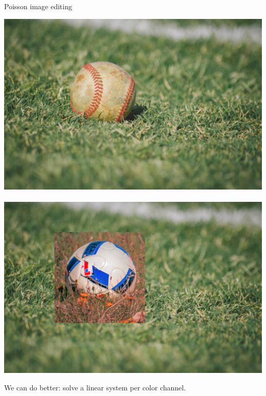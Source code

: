 \documentclass[UKenglish,aspectratio=169]{beamer}
\begin{document}
\begin{frame}{Poisson image editing}
\centerline{    \includegraphics[width=.36\linewidth]{../manuscript/img/pie_baseball.png}~\raisebox{6.5\height}{\LARGE{+}}~
    ~\raisebox{8.5\height}{\LARGE{=}}~
    \includegraphics[width=.36\linewidth]{../manuscript/img/pie_overlay.png}}
\pause
We can do better: solve a linear system per color channel.

\vspace{10pt}


\end{frame}
\end{document}
